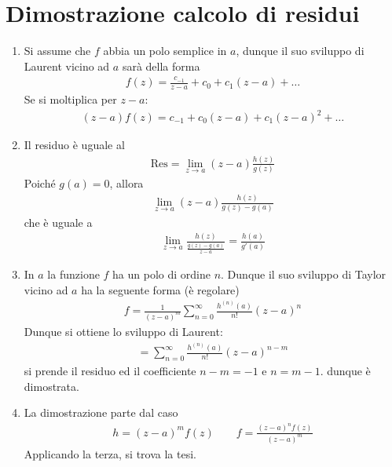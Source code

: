 \documentclass[a4paper, oneside]{article}
\begin{document}
\section{Dimostrazione calcolo di residui}
\begin{enumerate}
    \item Si assume che $f$ abbia un polo semplice in $a$, dunque il suo sviluppo di Laurent 
    vicino ad $a$ sarà della forma 
    \begin{gather*}
        f(z) = \frac{c_{-1}}{z - a} + c_0 + c_1(z - a) + \dots
    \end{gather*}
    Se si moltiplica per $z - a$:
    \begin{gather*}
        (z - a)f(z) = c_{-1} + c_0(z - a)+ c_{1}(z - a )^{2} + \dots
    \end{gather*}
    \item Il residuo è uguale al 
    \begin{gather*}
        \text{Res} = \lim_{z \to a} (z - a)\frac{h(z)}{g(z)} 
    \end{gather*}
    Poiché $g(a) = 0$, allora 
    \begin{gather*}
        \lim_{z \to a} (z - a)\frac{h(z)}{g(z) - g(a)} 
    \end{gather*}
    che è uguale a 
    \begin{gather*}
        \lim_{z \to a} \frac{h(z)}{\frac{g(z) - g(a)}{z - a}} = \frac{h(a)}{g'(a)} 
    \end{gather*}
    \item In $a$ la funzione $f$ ha un polo di ordine $n$. Dunque il suo sviluppo di Taylor 
    vicino ad $a$ ha la seguente forma (è regolare)
    \begin{gather*}
        f = \frac{1}{(z - a)^{m}} \sum_{n = 0}^{\infty } \frac{h^(n)(a)}{n!}(z - a )^{n} 
    \end{gather*}
    Dunque si ottiene lo sviluppo di Laurent: 
    \begin{gather*}
        = \sum_{n = 0}^{\infty } \frac{h^{(n)}(a)}{n!}(z - a)^{n - m}
    \end{gather*}
    si prende il residuo ed il coefficiente $n - m= - 1$ e $ n = m -1$. dunque è dimostrata.
    \item La dimostrazione parte dal caso 
    \begin{gather*}
        h = (z - a)^{m}f(z) \qquad f = \frac{(z - a)^{n}f(z)}{(z - a)^{m}} 
    \end{gather*}
    Applicando la terza, si trova la tesi.
\end{enumerate}
\end{document}
